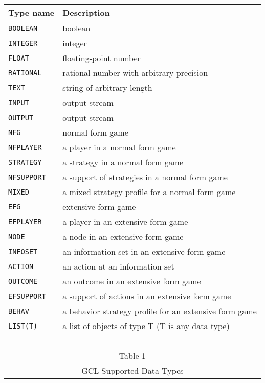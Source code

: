 \begin{table}[htp]
\begin{center}
\begin{tabular} {|l||l|} \hline
Type name	& Description \\ \hline
{\tt BOOLEAN} 	& boolean \\
{\tt INTEGER} 	& integer \\ 
{\tt FLOAT} 	& floating-point number \\
{\tt RATIONAL} 	& rational number with arbitrary precision \\
{\tt TEXT}	& string of arbitrary length \\
{\tt INPUT}	& output stream \\
{\tt OUTPUT}	& output stream \\ 
\hline
{\tt NFG}	& normal form game \\
{\tt NFPLAYER}	& a player in a normal form game \\
{\tt STRATEGY}	& a strategy in a normal form game \\
{\tt NFSUPPORT}	& a support of strategies in a normal form game \\
{\tt MIXED}	& a mixed strategy profile for a normal form game \\ 
\hline
{\tt EFG}	& extensive form game \\
{\tt EFPLAYER}	& a player in an extensive form game \\
{\tt NODE}	& a node in an extensive form game \\ 
{\tt INFOSET}	& an information set in an extensive form game \\
{\tt ACTION}	& an action at an information set \\
{\tt OUTCOME}	& an outcome in an extensive form game \\
{\tt EFSUPPORT}	& a support of actions in an extensive form game \\
{\tt BEHAV}	& a behavior strategy profile for an extensive form
game \\ 
\hline
{\tt LIST(T)}	& a list of objects of type T (T is any data type)\\ 
\hline
\multicolumn{2}{c}{\ }\\
\multicolumn{2}{c}{Table 1}\\
\multicolumn{2}{c}{GCL Supported Data Types}\\
\end{tabular}
\end{center}
\end{table}
\medskip

